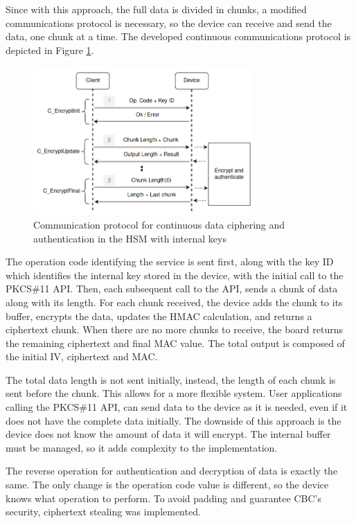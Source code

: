 Since with this approach, the full data is divided in chunks, a modified communications protocol is necessary, so the device can receive and send the data, one chunk at a time.  The developed continuous communications protocol is depicted in Figure \ref{fig:protocol:data-exchange-chunks}.
\begin{figure}[h!]
	\centering
	\includegraphics[width=0.75\textwidth]{./Images/data-exchange-chunks.png}
	\caption{Communication protocol for continuous data ciphering and authentication in the HSM with internal keys}
	\label{fig:protocol:data-exchange-chunks}
\end{figure}
The operation code identifying the service is sent first, along with the key ID which identifies the internal key stored in the device, with the initial call to the PKCS\#11 API.
Then, each subsequent call to the API, sends a chunk of data along with its length.
For each chunk received, the device adds the chunk to its buffer, encrypts the data, updates the HMAC calculation, and returns a ciphertext chunk.
When there are no more chunks to receive, the board returns the remaining ciphertext and final MAC value. The total output is composed of the initial IV, ciphertext and MAC.

The total data length is not sent initially, instead, the length of each chunk is sent before the chunk. This allows for a more flexible system. User applications calling the PKCS\#11 API, can send data to the device as it is needed, even if it does not have the complete data initially.
The downside of this approach is the device does not know the amount of data it will encrypt. The internal buffer must be managed, so it adds complexity to the implementation.

The reverse operation for authentication and decryption of data is exactly the same. The only change is the operation code value is different, so the device knows what operation to perform.
To avoid padding and guarantee CBC's security, ciphertext stealing was implemented.

